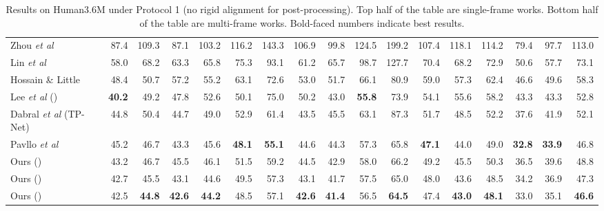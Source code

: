 \documentclass{bmvc2k}
\def\etal{\emph{et al}\bmvaOneDot}
\begin{document}
\begin{table*}[t]
{\begin{tabular}{l|rrrrrrrrrrrrrrr|r}
            Zhou \etal \cite{zhou2016sparseness} & 87.4 & 109.3 & 87.1 & 103.2 & 116.2 & 143.3 & 106.9 & 99.8 & 124.5 & 199.2 & 107.4 & 118.1 & 114.2 & 79.4 & 97.7 & 113.0\\
            Lin \etal \cite{lin2017recurrent} & 58.0 & 68.2 & 63.3 & 65.8 & 75.3 & 93.1 & 61.2 & 65.7 & 98.7 & 127.7 & 70.4 & 68.2 & 72.9 & 50.6 & 57.7 & 73.1\\
            Hossain \& Little \cite{hossain2018exploiting} & 48.4 & 50.7 & 57.2 & 55.2 & 63.1 & 72.6 & 53.0 & 51.7 & 66.1 & 80.9 & 59.0 & 57.3 & 62.4 & 46.6 & 49.6 & 58.3\\
            Lee \etal \cite{lee2018propagating} () & \textbf{40.2} & 49.2 & 47.8 & 52.6 & 50.1 & 75.0 & 50.2 & 43.0 & \textbf{55.8} & 73.9 & 54.1 & 55.6 & 58.2 & 43.3 & 43.3 & 52.8\\
            Dabral \etal \cite{dabral2018learning} (TP-Net) & 44.8 & 50.4 & 44.7 & 49.0 & 52.9 & 61.4 & 43.5 & 45.5 & 63.1 & 87.3 & 51.7 & 48.5 & 52.2 & 37.6 & 41.9 & 52.1\\
            Pavllo \etal \cite{pavllo20183d} & 45.2 & 46.7 & 43.3 & 45.6 & \textbf{48.1} & \textbf{55.1} & 44.6 & 44.3 & 57.3 & 65.8 & \textbf{47.1} & 44.0 & 49.0 & \textbf{32.8} & \textbf{33.9} & 46.8\\
            
            Ours () & 43.2 & 46.7 & 45.5 & 46.1 & 51.5 & 59.2 & 44.5 & 42.9 & 58.0 & 66.2 & 49.2 & 45.5 & 50.3 & 36.5 & 39.6 & 48.8\\
            Ours () & 42.7 & 45.5 & 43.1 & 44.6 & 49.5 & 57.3 & 43.1 & 41.7 & 57.5 & 65.0 & 48.0 & 43.6 & 48.5 & 34.2 & 36.9 & 47.3\\
            Ours () & 42.5 & \textbf{44.8} & \textbf{42.6} & \textbf{44.2} & 48.5 & 57.1 & \textbf{42.6} & \textbf{41.4} & 56.5 & \textbf{64.5} & 47.4 & \textbf{43.0} & \textbf{48.1} & 33.0 & 35.1 & \textbf{46.6}\\
            \hline
        \end{tabular}
    }
    \caption{Results on Human3.6M under Protocol 1 (no rigid alignment for post-processing). Top half of the table are single-frame works. Bottom half of the table are multi-frame works. Bold-faced numbers indicate best results.}
    \label{tab:protocol1}
\end{table*}
\end{document}
